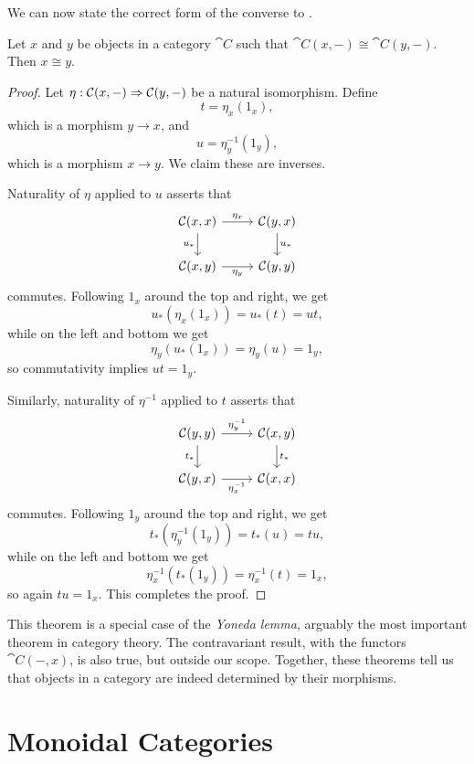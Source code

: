 
We can now state the correct form of the converse to .

\begin{thm}\label{thm:hom-iso-implies-iso}
  Let $x$ and $y$ be objects in a category $\cat{C}$ such that $\cat{C}(x,
  -)\cong\cat{C}(y, -)$. Then $x\cong y$.
\end{thm}

\begin{proof}
  Let $\eta: {\mathcal{C}}(x, -)\Rightarrow{\mathcal{C}}(y, -)$ be a natural isomorphism. Define \[
    t = \eta_x(1_x),
    \] which is a morphism $y\to x$, and \[
    u = \eta_y^{-1}(1_y),
  \]
  which is a morphism $x\to y$. We claim these are inverses.

  Naturality of $\eta$ applied to $u$ asserts that \[
    \begin{tikzcd}
      \cat{C}(x, x)\ar[r, "\eta_x"]\ar[d, "u_*"'] & \cat{C}(y, x)\ar[d, "u_*"] \\
      \cat{C}(x, y)\ar[r, "\eta_y"'] & \cat{C}(y, y)
    \end{tikzcd}
  \]
  commutes. Following $1_x$ around the top and right, we get \[
    u_*(\eta_x(1_x)) = u_*(t) = ut,
  \] while on the left and bottom we get \[
    \eta_y(u_*(1_x)) = \eta_y(u) = 1_y,
  \]
  so commutativity implies $ut = 1_y$.

  Similarly, naturality of $\eta^{-1}$ applied to $t$ asserts that \[
    \begin{tikzcd}
      \cat{C}(y, y)\ar[r, "\eta_y^{-1}"]\ar[d, "t_*"'] & \cat{C}(x, y)\ar[d, "t_*"] \\
      \cat{C}(y, x)\ar[r, "\eta_x^{-1}"'] & \cat{C}(x, x)
    \end{tikzcd}
  \]
  commutes. Following $1_y$ around the top and right, we get \[
    t_*(\eta_y^{-1}(1_y)) = t_*(u) = tu,
  \] while on the left and bottom we get \[
    \eta_x^{-1}(t_*(1_y)) = \eta_x^{-1}(t) = 1_x,
  \]
  so again $tu = 1_x$. This completes the proof.
\end{proof}

This theorem is a special case of the \emph{Yoneda lemma}, arguably the most
important theorem in category theory. The contravariant result, with the
functors $\cat{C}(-, x)$, is also true, but outside our scope. Together, these
theorems tell us that objects in a category are indeed determined by their
morphisms.


\section{Monoidal Categories}

